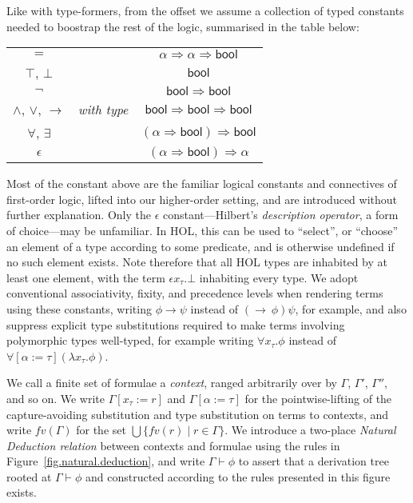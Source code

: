 \documentclass[a4paper, UKenglish, cleveref, autoref, thm-restate, colorlinks]{lipics-v2021}
\newcommand{\eps}[1]{\epsilon{#1}.}
\newcommand{\fall}[1]{\forall{#1}.}
\newcommand{\lam}[1]{\lambda{#1}.}
\begin{document}
Like with type-formers, from the offset we assume a collection of typed constants needed to boostrap the rest of the logic, summarised in the table below:
\begin{center}
\begin{tabular}{ccc}
$=$ & & $\alpha \Rightarrow \alpha \Rightarrow \mathsf{bool}$ \\
$\top$, $\bot$ & & $\mathsf{bool}$ \\
$\neg$ & & $\mathsf{bool} \Rightarrow \mathsf{bool}$ \\
$\wedge$, $\vee$, $\longrightarrow$ & \emph{with type} & $\mathsf{bool} \Rightarrow \mathsf{bool} \Rightarrow \mathsf{bool}$ \\
$\forall$, $\exists$ & & $(\alpha \Rightarrow \mathsf{bool}) \Rightarrow \mathsf{bool}$ \\
$\epsilon$ & & $(\alpha \Rightarrow \mathsf{bool}) \Rightarrow \mathsf{\alpha}$
\end{tabular}
\end{center}
Most of the constant above are the familiar logical constants and connectives of first-order logic, lifted into our higher-order setting, and are introduced without further explanation.
Only the $\epsilon$ constant---Hilbert's \emph{description operator}, a form of choice---may be unfamiliar.
In HOL, this can be used to ``select'', or ``choose'' an element of a type according to some predicate, and is otherwise undefined if no such element exists.
Note therefore that all HOL types are inhabited by at least one element, with the term $\eps{x_\tau}\bot$ inhabiting every type.
We adopt conventional associativity, fixity, and precedence levels when rendering terms using these constants, writing $\phi \longrightarrow \psi$ instead of $(\longrightarrow\ \phi)\psi$, for example, and also suppress explicit type substitutions required to make terms involving polymorphic types well-typed, for example writing $\fall{x_\tau}\phi$ instead of $\forall[\alpha := \tau](\lam{x_\tau}\phi)$.

We call a finite set of formulae a \emph{context}, ranged arbitrarily over by $\Gamma$, $\Gamma'$, $\Gamma''$, and so on.
We write $\Gamma[x_\tau := r]$ and $\Gamma[\alpha := \tau]$ for the pointwise-lifting of the capture-avoiding substitution and type substitution on terms to contexts, and write $fv(\Gamma)$ for the set $\bigcup \{ fv(r) \mid r \in \Gamma \}$.
We introduce a two-place \emph{Natural Deduction relation} between contexts and formulae using the rules in Figure~\ref{fig.natural.deduction}, and write $\Gamma \vdash \phi$ to assert that a derivation tree rooted at $\Gamma \vdash \phi$ and constructed according to the rules presented in this figure exists.
\end{document}
